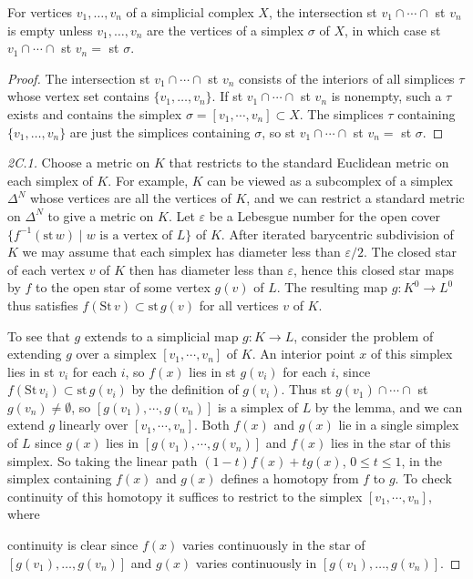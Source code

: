 \begin{lemma}
\label{lem:star-intersections}
For vertices $v_1, \ldots, v_n$ of a simplicial complex $X$, the intersection st $v_1 \cap \cdots \cap$ st $v_n$ is empty unless $v_1, \ldots, v_n$ are the vertices of a simplex $\sigma$ of $X$, in which case st $v_1 \cap \cdots \cap$ st $v_n = $ st $\sigma$.
\end{lemma}
\begin{proof}
 The intersection st $v_1 \cap \cdots \cap$ st $v_n$ consists of the interiors of all simplices $\tau$ whose vertex set contains $\{v_1, \ldots, v_n\}$. If st $v_1 \cap \cdots \cap$ st $v_n$ is nonempty, such a $\tau$ exists and contains the simplex $\sigma = [v_1, \cdots, v_n] \subset X$. The simplices $\tau$ containing $\{v_1, \ldots, v_n\}$ are just the simplices containing $\sigma$, so st $v_1 \cap \cdots \cap$ st $v_n = $ st $\sigma$.
\end{proof}
\begin{proof}[2C.1]
 Choose a metric on $K$ that restricts to the standard Euclidean metric on each simplex of $K$. For example, $K$ can be viewed as a subcomplex of a simplex $\Delta^N$ whose vertices are all the vertices of $K$, and we can restrict a standard metric on $\Delta^N$ to give a metric on $K$. Let $\varepsilon$ be a Lebesgue number for the open cover $\{f^{-1}(\text{st}\,w) \mid w \text{ is a vertex of } L\}$ of $K$. After iterated barycentric subdivision of $K$ we may assume that each simplex has diameter less than $\varepsilon/2$. The closed star of each vertex $v$ of $K$ then has diameter less than $\varepsilon$, hence this closed star maps by $f$ to the open star of some vertex $g(v)$ of $L$. The resulting map $g: K^0 \to L^0$ thus satisfies $f(\text{St}\,v) \subset \text{st}\,g(v)$ for all vertices $v$ of $K$.

To see that $g$ extends to a simplicial map $g: K \to L$, consider the problem of extending $g$ over a simplex $[v_1, \cdots, v_n]$ of $K$. An interior point $x$ of this simplex lies in st $v_i$ for each $i$, so $f(x)$ lies in st $g(v_i)$ for each $i$, since $f(\text{St}\,v_i) \subset \text{st}\,g(v_i)$ by the definition of $g(v_i)$. Thus st $g(v_1) \cap \cdots \cap$ st $g(v_n) \neq \emptyset$, so $[g(v_1), \cdots, g(v_n)]$ is a simplex of $L$ by the lemma, and we can extend $g$ linearly over $[v_1, \cdots, v_n]$. Both $f(x)$ and $g(x)$ lie in a single simplex of $L$ since $g(x)$ lies in $[g(v_1), \cdots, g(v_n)]$ and $f(x)$ lies in the star of this simplex. So taking the linear path $(1-t)f(x) + tg(x)$, $0 \le t \le 1$, in the simplex containing $f(x)$ and $g(x)$ defines a homotopy from $f$ to $g$. To check continuity of this homotopy it suffices to restrict to the simplex $[v_1, \cdots, v_n]$, where

continuity is clear since $f(x)$ varies continuously in the star of $[g(v_1), \ldots, g(v_n)]$ and $g(x)$ varies continuously in $[g(v_1), \ldots, g(v_n)]$.
\end{proof}
